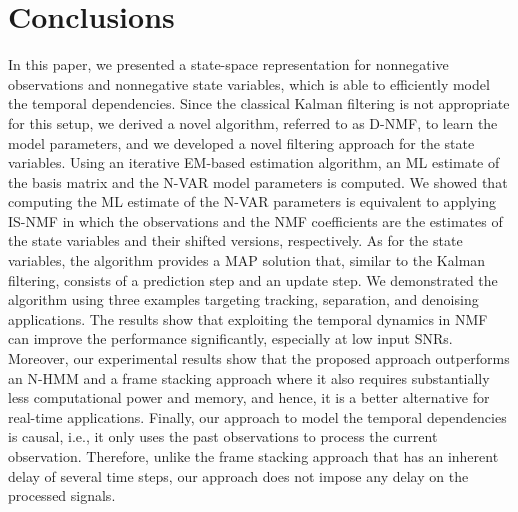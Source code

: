 \documentclass[10pt,twocolumn,twoside] {IEEEtran}
\begin{document}
\section{Conclusions\label{sec:Conclusions}}
In this paper, we presented a state-space representation for nonnegative
observations and nonnegative state variables, which is able to efficiently model the temporal dependencies. Since the classical
Kalman filtering is not appropriate for this setup, we derived a novel
algorithm, referred to as D-NMF, to learn the model parameters, and we developed a novel filtering approach for the state variables. Using an iterative EM-based estimation algorithm, an ML estimate of the basis matrix and the N-VAR model
parameters is computed. We showed that computing the ML estimate of the N-VAR parameters
is equivalent to applying IS-NMF in which the observations and the NMF
coefficients are the estimates of the state variables and their shifted versions, respectively.
As for the state variables, the algorithm provides a MAP solution
that, similar to the Kalman filtering, consists of a prediction step and
an update step. We demonstrated the algorithm using three examples
targeting tracking, separation, and denoising applications. The results
show that exploiting the temporal dynamics in NMF can improve the performance significantly,
especially at low input SNRs. Moreover, our experimental results show that the proposed approach outperforms an N-HMM and a frame stacking approach where it also requires substantially less computational power and memory, and hence, it is a better alternative for real-time applications. Finally, our approach to model the temporal dependencies is causal, i.e., it only uses the past observations to process the current observation. Therefore, unlike the frame stacking approach that has an inherent delay of several time steps, our approach does not impose any delay on the processed signals.
\ifCLASSOPTIONcaptionsoff
  \newpage
\fi

{

}















\end{document}
